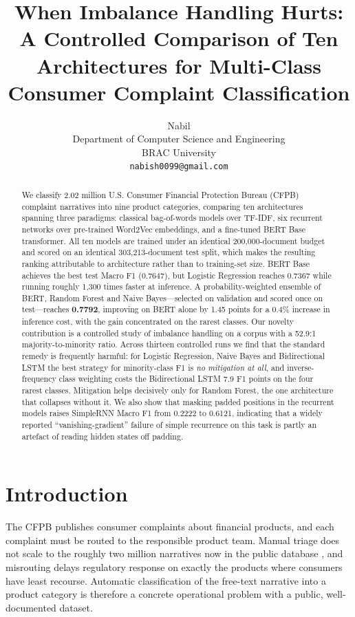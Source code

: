 \documentclass[11pt]{article}
\title{When Imbalance Handling Hurts: A Controlled Comparison of Ten
Architectures for Multi-Class Consumer Complaint Classification}
\author{
  Nabil \\
  Department of Computer Science and Engineering \\
  BRAC University \\
  \texttt{nabish0099@gmail.com}
}
\begin{document}
\maketitle

\begin{abstract}
We classify 2.02 million U.S. Consumer Financial Protection Bureau (CFPB)
complaint narratives into nine product categories, comparing ten architectures
spanning three paradigms: classical bag-of-words models over TF-IDF, six
recurrent networks over pre-trained Word2Vec embeddings, and a fine-tuned BERT
Base transformer. All ten models are trained under an identical
200{,}000-document budget and scored on an identical 303{,}213-document test
split, which makes the resulting ranking attributable to architecture rather
than to training-set size. BERT Base achieves the best test Macro F1 (0.7647),
but Logistic Regression reaches 0.7367 while running roughly 1{,}300 times
faster at inference. A probability-weighted ensemble of BERT, Random Forest and
Naive Bayes---selected on validation and scored once on test---reaches
\textbf{0.7792}, improving on BERT alone by 1.45 points for a 0.4\% increase in
inference cost, with the gain concentrated on the rarest classes. Our novelty
contribution is a controlled study of imbalance handling on a corpus with a
52.9:1 majority-to-minority ratio. Across thirteen
controlled runs we find that the standard remedy is frequently harmful: for
Logistic Regression, Naive Bayes and Bidirectional LSTM the best strategy for
minority-class F1 is \emph{no mitigation at all}, and inverse-frequency class
weighting costs the Bidirectional LSTM 7.9 F1 points on the four rarest classes.
Mitigation helps decisively only for Random Forest, the one architecture that
collapses without it. We also show that masking padded positions in the
recurrent models raises SimpleRNN Macro F1 from 0.2222 to 0.6121, indicating
that a widely reported ``vanishing-gradient'' failure of simple recurrence on
this task is partly an artefact of reading hidden states off padding.
\end{abstract}

\section{Introduction}
\label{sec:intro}

The CFPB publishes consumer complaints about financial products, and each
complaint must be routed to the responsible product team. Manual triage does not
scale to the roughly two million narratives now in the public database
\cite{cfpb2024database}, and misrouting delays regulatory response on exactly
the products where consumers have least recourse. Automatic classification of
the free-text narrative into a product category is therefore a concrete
operational problem with a public, well-documented dataset.
\end{document}
